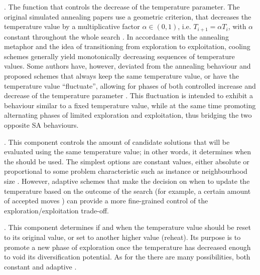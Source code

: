 {\coolingscheme.}
The function that controls the decrease of the temperature parameter.
The original simulated annealing papers use a geometric criterion, that decreases the temperature
value by a multiplicative factor $\alpha \in (0,1)$, i.e. $T_{i+1}=\alpha T_i$, with $\alpha$ constant throughout
the whole search \cite{Kirkpatrick83,Cer85}. In accordance with the annealing metaphor and the idea of
transitioning from exploration to exploitation, cooling schemes generally yield
monotonically decreasing sequences of temperature values. Some authors have,
however, deviated from the annealing behaviour and proposed schemes that
always keep the same temperature value, or have the temperature value
``fluctuate'', allowing for phases of both controlled increase and decrease
of the temperature parameter \cite{HuKahTsa95}. 
This fluctuation is intended to exhibit a behaviour similar to a fixed temperature value,
while at the same time promoting alternating phases of limited exploration and exploitation,
thus bridging the two opposite SA behaviours.

{\temperaturelength.}
This component controls the amount of candidate solutions that will be
evaluated using the same temperature value; in other words, it determines when
the \coolingscheme should be used.
The simplest options are constant values, either absolute or proportional to 
some problem characteristic such as instance or neighbourhood size
\cite{HusStu2014cor,JajMinHarPro1992}. However, 
adaptive schemes that make the decision on when to update the temperature 
based on the outcome of the search (for example, a certain amount of accepted moves \cite{Abramson1991})
can provide a more fine-grained control of the exploration/exploitation
trade-off.

{\temperaturerestart.}
This component determines if and when the temperature value
should be reset to its original value, or set to another higher value (reheat).
Its purpose is to promote a new phase of exploration once the temperature has 
decreased enough to void its diversification potential.
As for the \temperaturelength there are many possibilities, both constant and
adaptive \cite{Kirkpatrick1984,AbrAmoDan1999}.

